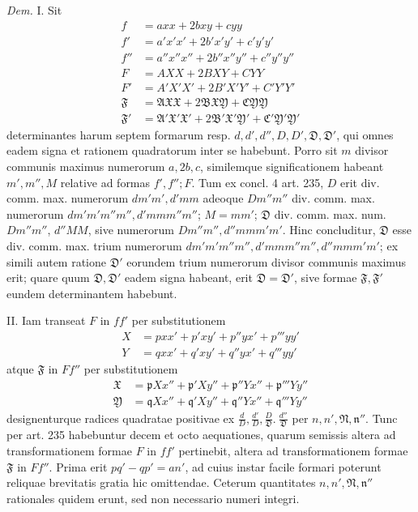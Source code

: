 \textit{Dem.} I. Sit
\[
\begin{aligned}
f&=axx+2bxy+cyy\\
f'&=a'x'x'+2b'x'y'+c'y'y'\\
f''&=a''x''x''+2b''x''y''+c''y''y''\\
F&=AXX+2BXY+CYY\\
F'&=A'X'X'+2B'X'Y'+C'Y'Y'\\
\mathfrak{F}&=\mathfrak{A}\mathfrak{X}\mathfrak{X}+2\mathfrak{B}\mathfrak{X}\mathfrak{Y}+\mathfrak{C}\mathfrak{Y}\mathfrak{Y}\\
\mathfrak{F}'&=\mathfrak{A}'\mathfrak{X}'\mathfrak{X}'+2\mathfrak{B}'\mathfrak{X}'\mathfrak{Y}'+\mathfrak{C}'\mathfrak{Y}'\mathfrak{Y}'
\end{aligned}
\]
determinantes harum septem formarum resp. $d,d',d'',D,D',\mathfrak{D},\mathfrak{D}'$, qui omnes eadem signa et rationem quadratorum inter se habebunt. Porro sit $m$ divisor communis maximus numerorum $a,2b,c$, similemque significationem habeant $m',m'',M$ relative ad formas $f',f'';F$. Tum ex concl. 4 art. 235, $D$ erit div. comm. max. numerorum $dm'm',d'mm$ adeoque $Dm''m''$ div. comm. max. numerorum $dm'm'm''m'',d'mmm''m''$; $M=mm'$; $\mathfrak{D}$ div. comm. max. num. $Dm''m''$, $d''MM$, sive numerorum $Dm''m'',d''mmm'm'$. Hinc concluditur, $\mathfrak{D}$ esse div. comm. max. trium numerorum $dm'm'm''m'',d'mmm''m'',d''mmm'm'$; ex simili autem ratione $\mathfrak{D}'$ eorundem trium numerorum divisor communis maximus erit; quare quum $\mathfrak{D},\mathfrak{D}'$ eadem signa habeant, erit $\mathfrak{D}=\mathfrak{D}'$, sive formae $\mathfrak{F},\mathfrak{F}'$ eundem determinantem habebunt.

II. Iam transeat $F$ in $ff'$ per substitutionem
\[
\begin{aligned}
X&=pxx'+p'xy'+p''yx'+p'''yy'\\
Y&=qxx'+q'xy'+q''yx'+q'''yy'
\end{aligned}
\]
atque $\mathfrak{F}$ in $Ff''$ per substitutionem
\[
\begin{aligned}
\mathfrak{X}&=\mathfrak{p}Xx''+\mathfrak{p}'Xy''+\mathfrak{p}''Yx''+\mathfrak{p}'''Yy''\\
\mathfrak{Y}&=\mathfrak{q}Xx''+\mathfrak{q}'Xy''+\mathfrak{q}''Yx''+\mathfrak{q}'''Yy''
\end{aligned}
\]
designenturque radices quadratae positivae ex $\frac{d}{D},\frac{d'}{D},\frac{D}{\mathfrak{D}}.\ \frac{d''}{\mathfrak{D}}$ per $n,n',\mathfrak{N},\mathfrak{n}''$. Tunc per art. 235 habebuntur decem et octo aequationes, quarum semissis altera ad transformationem formae $F$ in $ff'$ pertinebit, altera ad transformationem formae $\mathfrak{F}$ in $Ff''$. Prima erit $pq'-qp'=an'$, ad cuius instar facile formari poterunt reliquae brevitatis gratia hic omittendae. Ceterum quantitates $n,n',\mathfrak{N},\mathfrak{n}''$ rationales quidem erunt, sed non necessario numeri integri.

